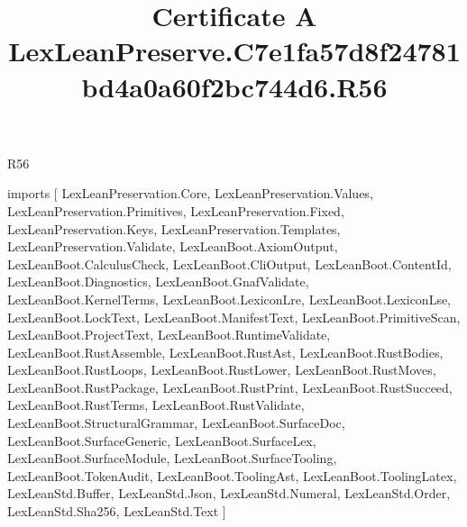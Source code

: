 \begin{lexlean}{R56}
\title{Certificate A LexLeanPreserve.C7e1fa57d8f24781bd4a0a60f2bc744d6.R56}
\begin{coremodule}
imports [
  LexLeanPreservation.Core,
  LexLeanPreservation.Values,
  LexLeanPreservation.Primitives,
  LexLeanPreservation.Fixed,
  LexLeanPreservation.Keys,
  LexLeanPreservation.Templates,
  LexLeanPreservation.Validate,
  LexLeanBoot.AxiomOutput,
  LexLeanBoot.CalculusCheck,
  LexLeanBoot.CliOutput,
  LexLeanBoot.ContentId,
  LexLeanBoot.Diagnostics,
  LexLeanBoot.GnafValidate,
  LexLeanBoot.KernelTerms,
  LexLeanBoot.LexiconLre,
  LexLeanBoot.LexiconLse,
  LexLeanBoot.LockText,
  LexLeanBoot.ManifestText,
  LexLeanBoot.PrimitiveScan,
  LexLeanBoot.ProjectText,
  LexLeanBoot.RuntimeValidate,
  LexLeanBoot.RustAssemble,
  LexLeanBoot.RustAst,
  LexLeanBoot.RustBodies,
  LexLeanBoot.RustLoops,
  LexLeanBoot.RustLower,
  LexLeanBoot.RustMoves,
  LexLeanBoot.RustPackage,
  LexLeanBoot.RustPrint,
  LexLeanBoot.RustSucceed,
  LexLeanBoot.RustTerms,
  LexLeanBoot.RustValidate,
  LexLeanBoot.StructuralGrammar,
  LexLeanBoot.SurfaceDoc,
  LexLeanBoot.SurfaceGeneric,
  LexLeanBoot.SurfaceLex,
  LexLeanBoot.SurfaceModule,
  LexLeanBoot.SurfaceTooling,
  LexLeanBoot.TokenAudit,
  LexLeanBoot.ToolingAst,
  LexLeanBoot.ToolingLatex,
  LexLeanStd.Buffer,
  LexLeanStd.Json,
  LexLeanStd.Numeral,
  LexLeanStd.Order,
  LexLeanStd.Sha256,
  LexLeanStd.Text
]


\end{coremodule}
\end{lexlean}
